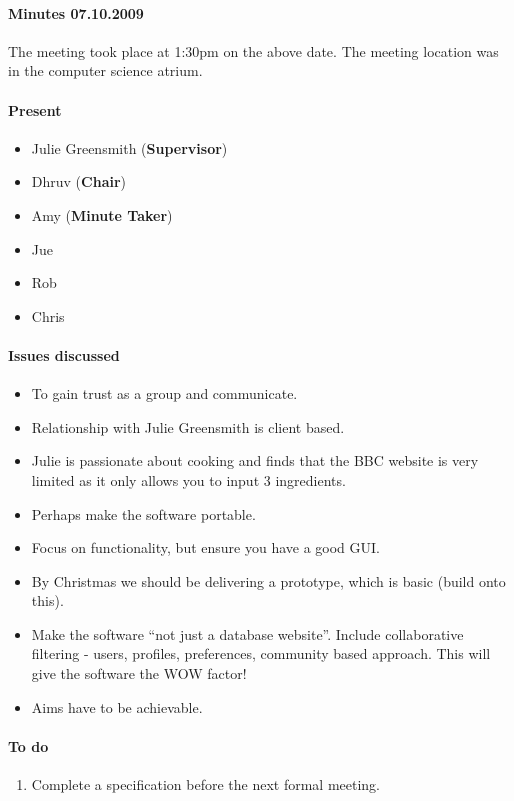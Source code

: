 \paragraph{Minutes 07.10.2009}  
The meeting took place at 1:30pm on the above date. The meeting location was in the computer science atrium. 

\paragraph{Present}

\begin{itemize}
	\item Julie Greensmith (\textbf{Supervisor})
	\item Dhruv (\textbf{Chair})
	\item Amy (\textbf{Minute Taker})
	\item Jue
	\item Rob
	\item Chris 
	
\end{itemize}

\paragraph{Issues discussed}

\begin{itemize}
	\item To gain trust as a group and communicate.
	\item Relationship with Julie Greensmith is client based. 
	\item Julie is passionate about cooking and finds that the BBC website is very limited as it only allows you to input 3 ingredients.
	\item Perhaps make the software portable.
	\item Focus on functionality, but ensure you have a good GUI. 
	\item By Christmas we should be delivering a prototype, which is basic (build onto this).
	\item Make the software “not just a database website”. Include collaborative filtering - users, profiles, preferences, community based approach. This will give the software the WOW factor!
	\item Aims have to be achievable.
	
\end{itemize}

\paragraph{To do}

\begin{enumerate}
	\item Complete a specification before the next formal meeting.
\end{enumerate}
